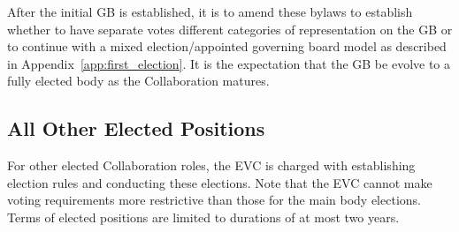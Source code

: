 \documentclass[12pt]{article}
\begin{document}
After the initial GB is established, it is to amend these bylaws to establish whether to have separate votes different categories of representation on the GB or to continue with a mixed election/appointed governing board model as described in Appendix~\ref{app:first_election}. It is the expectation that the GB be evolve to a fully elected body as the Collaboration matures.




\subsection{All Other Elected Positions}
For other elected Collaboration roles, the EVC is charged with establishing election rules and conducting these elections. Note that the EVC cannot make voting requirements more restrictive than those for the main body elections. Terms of elected positions are limited to durations of at most two years. 
\end{document}
